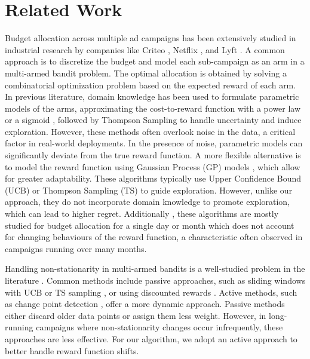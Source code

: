 \section{Related Work}
\label{relatedwork}
Budget allocation across multiple ad campaigns \cite{farris2015marketing, 10.5555/3618408.3618709} has been extensively studied in industrial research by companies like Criteo \cite{DElia2019}, Netflix \cite{lewis2022incrementality}, and Lyft \cite{hancontextual}. A common approach is to discretize the budget and model each sub-campaign as an arm in a multi-armed bandit problem. The optimal allocation is obtained by solving a combinatorial optimization problem \cite{zhang2017multi}  based on the expected reward of each arm. In previous literature, domain knowledge has been used to formulate parametric models of the arms, approximating the cost-to-reward function with a power law \cite{hanbudget} or a sigmoid \cite{giglimulti}, followed by Thompson Sampling to handle uncertainty and induce exploration. However, these methods often overlook noise in the data, a critical factor in real-world deployments. In the presence of noise, parametric models can significantly deviate from the true reward function. A more flexible alternative is to model the reward function using Gaussian Process (GP) models \cite{nuara2022online, Nuara2018ACA}, which allow for greater adaptability. These algorithms typically use Upper Confidence Bound (UCB) or Thompson Sampling (TS) to guide exploration. However, unlike our approach, they do not incorporate domain knowledge to promote exploration, which can lead to higher regret. Additionally , these algorithms are mostly studied for budget allocation for a single day or month \cite{nuara2022online} which does not account for changing behaviours of the reward function, a characteristic often observed in campaigns running over many months.

Handling non-stationarity in multi-armed bandits is a well-studied problem in the literature \cite{cavenaghi2021non, besbes2014stochastic, re2021exploiting}. Common methods include passive approaches, such as sliding windows with UCB or TS sampling \cite{trovo2020sliding}, or using discounted rewards \cite{garivier2011upper}. Active methods, such as change point detection \cite{liu2018change, cao2019nearly}, offer a more dynamic approach. Passive methods either discard older data points or assign them less weight. However, in long-running campaigns where non-stationarity changes occur infrequently, these approaches are less effective. For our algorithm, we adopt an active approach to better handle reward function shifts.